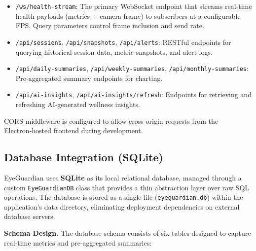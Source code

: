 \documentclass[12pt]{report}
\begin{document}
\begin{itemize}
    \item \texttt{/ws/health-stream}: The primary WebSocket endpoint that streams real‑time health payloads (metrics + camera frame) to subscribers at a configurable FPS. Query parameters control frame inclusion and send rate.
    \item \texttt{/api/sessions}, \texttt{/api/snapshots}, \texttt{/api/alerts}: RESTful endpoints for querying historical session data, metric snapshots, and alert logs.
    \item \texttt{/api/daily-summaries}, \texttt{/api/weekly-summaries}, \texttt{/api/monthly-summaries}: Pre‑aggregated summary endpoints for charting.
    \item \texttt{/api/ai-insights}, \texttt{/api/ai-insights/refresh}: Endpoints for retrieving and refreshing AI‑generated wellness insights.
\end{itemize}

CORS middleware is configured to allow cross‑origin requests from the Electron‑hosted frontend during development.

\subsection{Database Integration (SQLite)}

EyeGuardian uses \textbf{SQLite} as its local relational database, managed through a custom \texttt{EyeGuardianDB} class that provides a thin abstraction layer over raw SQL operations. The database is stored as a single file (\texttt{eyeguardian.db}) within the application's data directory, eliminating deployment dependencies on external database servers.

\textbf{Schema Design.} The database schema consists of six tables designed to capture real‑time metrics and pre‑aggregated summaries:
\end{document}
